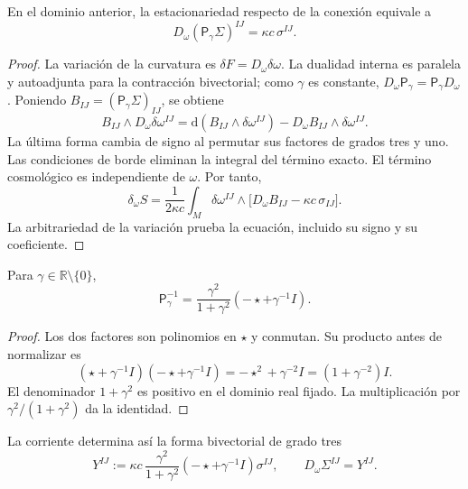 \begin{theorem}
\label{vii:thm:ecuacion-cartan-holst}
En el dominio anterior, la estacionariedad respecto de la conexión
equivale a
\begin{equation}
 D_\omega(\mathsf P_\gamma\Sigma)^{IJ}
       =\kappa c\,\sigma^{IJ}.
 \label{vii:eq:ecuacion-cartan-holst}
\end{equation}
\end{theorem}
\begin{proof}
La variación de la curvatura es
\(\delta F=D_\omega\delta\omega\). La dualidad interna es paralela
y autoadjunta para la contracción bivectorial; como \(\gamma\) es
constante, \(D_\omega\mathsf P_\gamma=\mathsf P_\gamma D_\omega\).
Poniendo \(B_{IJ}=(\mathsf P_\gamma\Sigma)_{IJ}\), se obtiene
\[
 B_{IJ}\wedge D_\omega\delta\omega^{IJ}
 =\mathrm d(B_{IJ}\wedge\delta\omega^{IJ})
   -D_\omega B_{IJ}\wedge\delta\omega^{IJ}.
\]
La última forma cambia de signo al permutar sus factores de grados tres
y uno. Las condiciones de borde eliminan la integral del término
exacto. El término cosmológico es independiente de \(\omega\).
Por tanto,
\[
 \delta_\omega S=
 \frac1{2\kappa c}\int_M\delta\omega^{IJ}\wedge
       \bigl[D_\omega B_{IJ}-\kappa c\,\sigma_{IJ}\bigr].
\]
La arbitrariedad de la variación prueba la ecuación, incluido su signo
y su coeficiente.
\end{proof}

\begin{lemma}
\label{vii:lem:inversa-holst}
Para \(\gamma\in\mathbb R\setminus\{0\}\),
\begin{equation}
 \mathsf P_\gamma^{-1}
 =\frac{\gamma^2}{1+\gamma^2}
                      (-\star+\gamma^{-1}I).
 \label{vii:eq:inversa-holst}
\end{equation}
\end{lemma}
\begin{proof}
Los dos factores son polinomios en \(\star\) y conmutan. Su producto
antes de normalizar es
\[
 (\star+\gamma^{-1}I)(-\star+\gamma^{-1}I)
 =-\star^2+\gamma^{-2}I=(1+\gamma^{-2})I.
\]
El denominador \(1+\gamma^2\) es positivo en el dominio real fijado.
La multiplicación por \(\gamma^2/(1+\gamma^2)\) da la identidad.
\end{proof}

La corriente determina así la forma bivectorial de grado tres
\begin{equation}
 Y^{IJ}:=\kappa c\,
   \frac{\gamma^2}{1+\gamma^2}
   (-\star+\gamma^{-1}I)\sigma^{IJ},
 \qquad D_\omega\Sigma^{IJ}=Y^{IJ}.
 \label{vii:eq:corriente-dualizada}
\end{equation}


